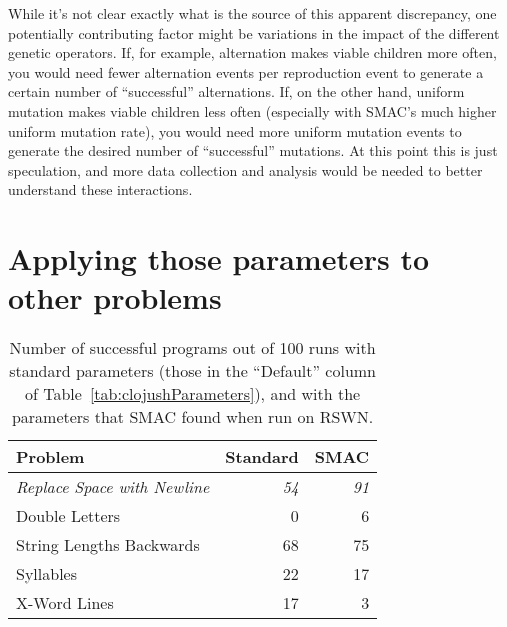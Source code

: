 While it's not clear exactly what is the source of this apparent discrepancy,
one potentially contributing factor might be variations in the impact of the
different genetic operators. If, for example, alternation makes viable 
children more often, you would need fewer alternation events 
per reproduction event to generate a certain number of ``successful''
alternations. If, on the other hand, uniform mutation makes viable children 
less often (especially with SMAC's much higher uniform mutation rate), 
you would need more uniform mutation events to generate the
desired number of ``successful'' mutations. At this point this is just
speculation, and more data collection and analysis would be needed to better
understand these interactions.

\section{Applying those parameters to other problems}
\label{sec:applyingToOtherProblems}

%
%

\begin{table}[t]
\centering
\caption{Number of successful programs out of 100 runs with standard parameters (those in the ``Default'' column of Table~\ref{tab:clojushParameters}), and with the parameters that SMAC found when run on RSWN.}
\label{table:results}
\begin{tabular}{l r r}
\toprule
\textbf{Problem} & \textbf{Standard} & \textbf{SMAC} \tabularnewline
\midrule
\textit{Replace Space with Newline} & \textit{54} & \textit{91} \tabularnewline
Double Letters	& 0 & 6 \tabularnewline
String Lengths Backwards & 68 & 75 \tabularnewline
Syllables & 22 & 17 \tabularnewline
X-Word Lines & 17 & 3 \tabularnewline
\bottomrule
\end{tabular}
\end{table}

